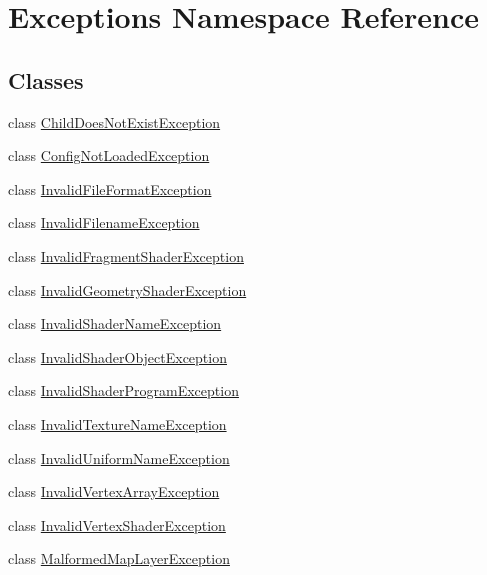 \hypertarget{namespace_exceptions}{}\section{Exceptions Namespace Reference}
\label{namespace_exceptions}
\subsection*{Classes}
\begin{DoxyCompactItemize}
\item 
class \hyperlink{class_exceptions_1_1_child_does_not_exist_exception}{Child\+Does\+Not\+Exist\+Exception}
\item 
class \hyperlink{class_exceptions_1_1_config_not_loaded_exception}{Config\+Not\+Loaded\+Exception}
\item 
class \hyperlink{class_exceptions_1_1_invalid_file_format_exception}{Invalid\+File\+Format\+Exception}
\item 
class \hyperlink{class_exceptions_1_1_invalid_filename_exception}{Invalid\+Filename\+Exception}
\item 
class \hyperlink{class_exceptions_1_1_invalid_fragment_shader_exception}{Invalid\+Fragment\+Shader\+Exception}
\item 
class \hyperlink{class_exceptions_1_1_invalid_geometry_shader_exception}{Invalid\+Geometry\+Shader\+Exception}
\item 
class \hyperlink{class_exceptions_1_1_invalid_shader_name_exception}{Invalid\+Shader\+Name\+Exception}
\item 
class \hyperlink{class_exceptions_1_1_invalid_shader_object_exception}{Invalid\+Shader\+Object\+Exception}
\item 
class \hyperlink{class_exceptions_1_1_invalid_shader_program_exception}{Invalid\+Shader\+Program\+Exception}
\item 
class \hyperlink{class_exceptions_1_1_invalid_texture_name_exception}{Invalid\+Texture\+Name\+Exception}
\item 
class \hyperlink{class_exceptions_1_1_invalid_uniform_name_exception}{Invalid\+Uniform\+Name\+Exception}
\item 
class \hyperlink{class_exceptions_1_1_invalid_vertex_array_exception}{Invalid\+Vertex\+Array\+Exception}
\item 
class \hyperlink{class_exceptions_1_1_invalid_vertex_shader_exception}{Invalid\+Vertex\+Shader\+Exception}
\item 
class \hyperlink{class_exceptions_1_1_malformed_map_layer_exception}{Malformed\+Map\+Layer\+Exception}

\end{DoxyCompactItemize}

